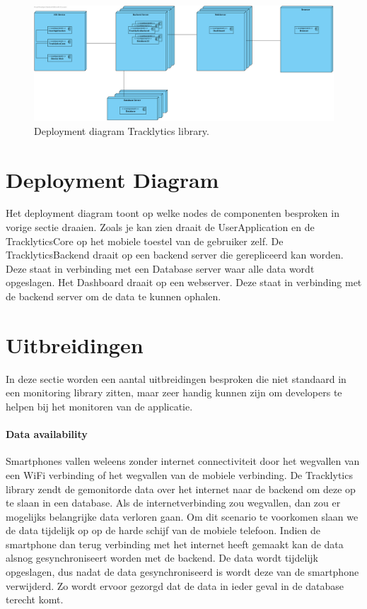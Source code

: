 \begin{figure}[!h]
  \centering
  \includegraphics[scale=0.30]{Afbeeldingen/Architectuur/Deployment}
  \caption{Deployment diagram Tracklytics library.}
  \label{fig:deployment}
\end{figure}
\section{Deployment Diagram}
Het deployment diagram toont op welke nodes de componenten besproken in vorige sectie draaien. Zoals je kan zien draait de UserApplication en de TracklyticsCore op het mobiele toestel van de gebruiker zelf. De TracklyticsBackend draait op een backend server die gerepliceerd kan worden. Deze staat in verbinding met een Database server waar alle data wordt opgeslagen. Het Dashboard draait op een webserver. Deze staat in verbinding met de backend server om de data te kunnen ophalen.

\section{Uitbreidingen}
In deze sectie worden een aantal uitbreidingen besproken die niet standaard in een monitoring library zitten, maar zeer handig kunnen zijn om developers te helpen bij het monitoren van de applicatie.

\paragraph{Data availability}
Smartphones vallen weleens zonder internet connectiviteit door het wegvallen van een WiFi verbinding of het wegvallen van de mobiele verbinding. De Tracklytics library zendt de gemonitorde data over het internet naar de backend om deze op te slaan in een database. Als de internetverbinding zou wegvallen, dan zou er mogelijks belangrijke data verloren gaan. Om dit scenario te voorkomen slaan we de data tijdelijk op op de harde schijf van de mobiele telefoon. Indien de smartphone dan terug verbinding met het internet heeft gemaakt kan de data alsnog gesynchroniseert worden met de backend. De data wordt tijdelijk opgeslagen, dus nadat de data gesynchroniseerd is wordt deze van de smartphone verwijderd. Zo wordt ervoor gezorgd dat de data in ieder geval in de database terecht komt. 

